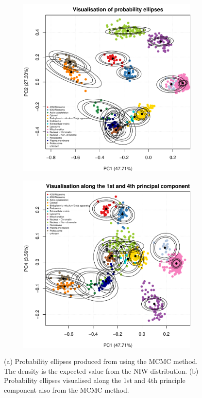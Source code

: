 \documentclass[12pt,english]{article}
\begin{document}
\begin{figure}[ht]
  \begin{subfigure}[t]{0.5\textwidth}
        \centering
\includegraphics{tagm-006}
        \caption{}
\end{subfigure}%
\hfill
\begin{subfigure}[t]{0.5\textwidth}
\includegraphics{tagm-007}
        \centering
        \caption{}
\end{subfigure}
  \centering
  \caption{(a) Probability ellipses produced from using the MCMC method.
    The density is the expected value from the NIW distribution. (b)
    Probability ellipses visualised along the 1st and
    4th principle component also from the MCMC method.}
\label{figure::pcaellipseMCMC}
\end{figure}
\end{document}
